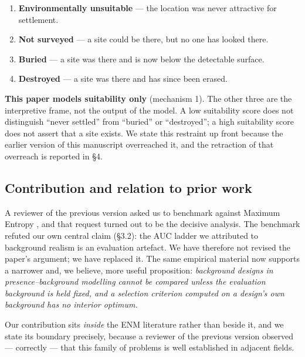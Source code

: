 \documentclass[12pt]{article}
\begin{document}
\begin{enumerate}
  \item \textbf{Environmentally unsuitable} --- the location was never attractive for settlement.
  \item \textbf{Not surveyed} --- a site could be there, but no one has looked there.
  \item \textbf{Buried} --- a site was there and is now below the detectable surface.
  \item \textbf{Destroyed} --- a site was there and has since been erased.
\end{enumerate}

\textbf{This paper models suitability only} (mechanism 1).
The other three are the interpretive frame, not the output of the model.
A low suitability score does not distinguish ``never settled'' from ``buried'' or ``destroyed''; a high suitability score does not assert that a site exists.
We state this restraint up front because the earlier version of this manuscript overreached it, and the retraction of that overreach is reported in \S4.

\subsection{Contribution and relation to prior work}

A reviewer of the previous version asked us to benchmark against Maximum Entropy \citep{elith2006}, and that request turned out to be the decisive analysis.
The benchmark refuted our own central claim (\S3.2): the AUC ladder we attributed to background realism is an evaluation artefact.
We have therefore not revised the paper's argument; we have replaced it.
The same empirical material now supports a narrower and, we believe, more useful proposition: \emph{background designs in presence--background modelling cannot be compared unless the evaluation background is held fixed, and a selection criterion computed on a design's own background has no interior optimum.}

Our contribution sits \emph{inside} the ENM literature rather than beside it, and we state its boundary precisely, because a reviewer of the previous version observed --- correctly --- that this family of problems is well established in adjacent fields.
\end{document}
